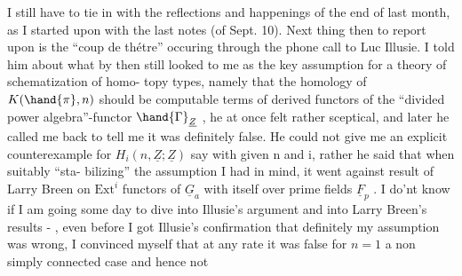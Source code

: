 I still have to tie in with the reflections and happenings of the end
of last month, as I started upon with the last notes (of Sept. 10). Next
thing then to report upon is the ``coup de th\'etre'' occuring through 
the phone call to Luc Illusie.  I told him about what by then still
looked to me as the key assumption for a theory of schematization of homo-%
topy types, namely that the homology of $K(\hand{\pi},n)$ should be computable 
terms of derived functors of the ``divided power algebra''-functor $\hand{\Gamma}_{\underline{Z}}$ , he
at once felt rather sceptical, and later he called me back to tell me it
was definitely false. He could not give me an explicit counterexample for
$H_{i}(n,\underline{Z};\underline{Z})$ say with given n and i, rather he said that when suitably ``sta-%
bilizing'' the assumption I had in mind, it went against result of Larry
Breen on $\mathrm{Ext}^{i}$ functors of $\underline{G}_{a}$ with itself over prime fields $\underline{F}_{p}$ . I do'nt
know if I am going some day to dive into Illusie's argument and into Larry
Breen's results - , even before I got Illusie's confirmation
that definitely my assumption was wrong, I convinced myself that at any
rate it was false for $n=1$   a non simply connected case and hence not


